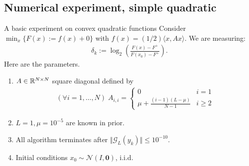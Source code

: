 \documentclass[11pt]{beamer}
\theoremstyle{definition}
\begin{document}
    \subsection{Numerical experiment, simple quadratic}
        \begin{frame}{A basic experiment on convex quadratic functions}
            Consider $\min_{x}\{F(x) := f(x) + 0\}$ with $f(x) = (1/2)\langle x, Ax\rangle$. 
            We are measuring: 
            \begin{align*}
                \delta_k := \log_2\left(
                    \frac{F(x) - F^+}{F(x_0) - F^+}\right).  
            \end{align*}
            Here are the parameters. 
            \begin{enumerate}
                \item $A \in \mathbb R^{N \times N}$ square diagonal defined by 
                \begin{align*}
                    (\forall i = 1, \ldots, N)\; A_{i, i} = \begin{cases}
                        0 & i = 1
                        \\
                        \mu + \frac{(i - 1)(L - \mu)}{N - 1} & i \ge 2
                    \end{cases}
                \end{align*}
                \item $L = 1, \mu = 10^{-5}$ are known in prior. 
                \item All algorithm terminates after $\Vert \mathcal G_L(y_k) \Vert \le 10^{-10}$. 
                \item Initial conditions $x_0 \sim \mathcal N(I, \mathbf 0)$, i.i.d. 
            \end{enumerate}
        \end{frame}
\end{document}

